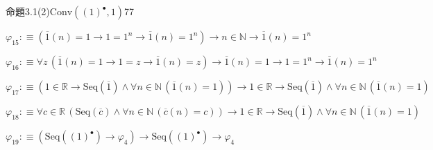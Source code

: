 \begin{fullproof}{命題3.1(2)}{$\mathrm{Conv}({(1)^{\bullet}},1)$}{77}
\begin{abbrevlist}
\item $\varphi_{15} :\equiv (\overline{1}(n) = 1 \to 1 = {{1}^{n}} \to \overline{1}(n) = {{1}^{n}}) \to n \in \mathbb{N} \to \overline{1}(n) = {{1}^{n}}$
\item $\varphi_{16} :\equiv \forall z\,(\overline{1}(n) = 1 \to 1 = z \to \overline{1}(n) = z) \to \overline{1}(n) = 1 \to 1 = {{1}^{n}} \to \overline{1}(n) = {{1}^{n}}$
\item $\varphi_{17} :\equiv (1 \in \mathbb{R} \to \mathrm{Seq}(\overline{1}) \land \forall n \in \mathbb{N}\,(\overline{1}(n) = 1)) \to 1 \in \mathbb{R} \to \mathrm{Seq}(\overline{1}) \land \forall n \in \mathbb{N}\,(\overline{1}(n) = 1)$
\item $\varphi_{18} :\equiv \forall c \in \mathbb{R}\,(\mathrm{Seq}(\overline{c}) \land \forall n \in \mathbb{N}\,(\overline{c}(n) = c)) \to 1 \in \mathbb{R} \to \mathrm{Seq}(\overline{1}) \land \forall n \in \mathbb{N}\,(\overline{1}(n) = 1)$
\item $\varphi_{19} :\equiv (\mathrm{Seq}({(1)^{\bullet}}) \to \varphi_{4}) \to \mathrm{Seq}({(1)^{\bullet}}) \to \varphi_{4}$
\end{abbrevlist}
\end{fullproof}
